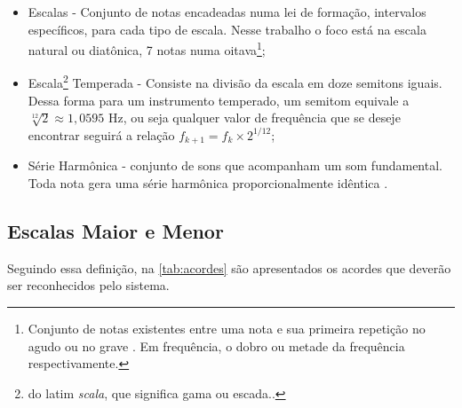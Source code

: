\begin{itemize}
   \item Escalas - Conjunto de notas encadeadas numa lei de formação, intervalos específicos, para cada tipo de escala. Nesse trabalho o foco está na escala natural ou diatônica, 7 notas numa oitava\footnote{Conjunto de notas existentes entre uma nota e sua primeira repetição no agudo ou no grave \cite{lacerda1967}. Em frequência, o dobro ou metade da frequência respectivamente.};
   \item Escala\footnote{do latim \textit{scala}, que significa gama ou escada.\cite{med1996}.} Temperada - Consiste na divisão da escala em doze semitons iguais. Dessa forma para um instrumento temperado, um semitom equivale a $\sqrt[12]{2}\approx1,0595$ Hz, ou seja qualquer valor de frequência que se deseje encontrar seguirá a relação $f_{k+1} = f_k\times2^{1/12}$;
   \item Série Harmônica - conjunto de sons que acompanham um som fundamental. Toda nota gera uma série harmônica proporcionalmente idêntica \cite[p. 92]{med1996}.
\end{itemize}

\subsection{Escalas Maior e Menor}

Seguindo essa definição, na \autoref{tab:acordes} são apresentados os acordes que deverão ser reconhecidos pelo sistema.

